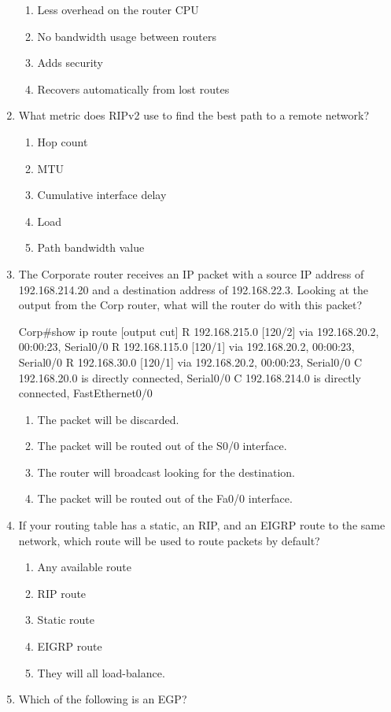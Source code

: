 \begin{enumerate}
  \begin{enumerate}
    \item
    Less overhead on the router CPU
  \item
    No bandwidth usage between routers
  \item
    Adds security
  \item
    Recovers automatically from lost routes
  \end{enumerate}
\item
  What metric does RIPv2 use to find the best path to a remote network?

  \begin{enumerate}
    \item
    Hop count
  \item
    MTU
  \item
    Cumulative interface delay
  \item
    Load
  \item
    Path bandwidth value
  \end{enumerate}
\item
  The Corporate router receives an IP packet with a source IP address of
  192.168.214.20 and a destination address of 192.168.22.3. Looking at
  the output from the Corp router, what will the router do with this
  packet?

\begin{cli}
Corp#show ip route
[output cut]
R    192.168.215.0 [120/2] via 192.168.20.2, 00:00:23, Serial0/0
R    192.168.115.0 [120/1] via 192.168.20.2, 00:00:23, Serial0/0
R    192.168.30.0 [120/1] via 192.168.20.2, 00:00:23, Serial0/0
C    192.168.20.0 is directly connected, Serial0/0
C    192.168.214.0 is directly connected, FastEthernet0/0
\end{cli}

  \begin{enumerate}
    \item
    The packet will be discarded.
  \item
    The packet will be routed out of the S0/0 interface.
  \item
    The router will broadcast looking for the destination.
  \item
    The packet will be routed out of the Fa0/0 interface.
  \end{enumerate}
\item
  If your routing table has a static, an RIP, and an EIGRP route to the
  same network, which route will be used to route packets by default?

  \begin{enumerate}
    \item
    Any available route
  \item
    RIP route
  \item
    Static route
  \item
    EIGRP route
  \item
    They will all load-balance.
  \end{enumerate}
\item
  Which of the following is an EGP?


\end{enumerate}

